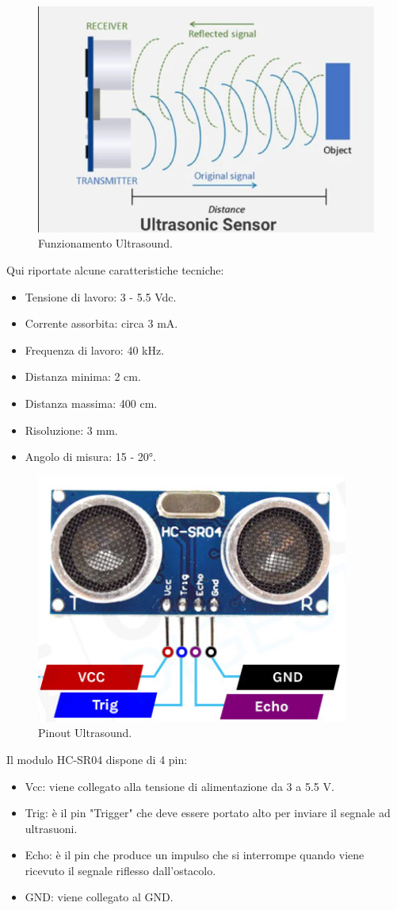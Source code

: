 \documentclass{article}
\begin{document}
\begin{figure}[H]
\centering
\includegraphics[width=0.6\linewidth]{image/ultrafunc.png}
\caption{\label{fig:ultrafunc}Funzionamento Ultrasound.}
\end{figure}

Qui riportate alcune caratteristiche tecniche:
\begin{itemize}
    \item Tensione di lavoro: 3 - 5.5 Vdc.
    \item Corrente assorbita: circa 3 mA.
    \item Frequenza di lavoro: 40 kHz.
    \item Distanza minima: 2 cm.
    \item Distanza massima: 400 cm.
    \item Risoluzione: 3 mm.
    \item Angolo di misura: 15 - 20°.
\end{itemize}

\begin{figure}[H]
\centering
\includegraphics[width=0.6\linewidth]{image/pinoutultra.png}
\caption{\label{fig:pinoutultra}Pinout Ultrasound.}
\end{figure}
Il modulo HC-SR04 dispone di 4 pin:

\begin{itemize}
    \item Vcc: viene collegato alla tensione di alimentazione da 3 a 5.5 V.
    \item Trig: è il pin "Trigger" che deve essere portato alto per inviare il segnale ad ultrasuoni.
    \item Echo: è il pin che produce un impulso che si interrompe quando viene ricevuto il segnale riflesso dall’ostacolo.
    \item GND: viene collegato al GND.
\end{itemize}
\end{document}

